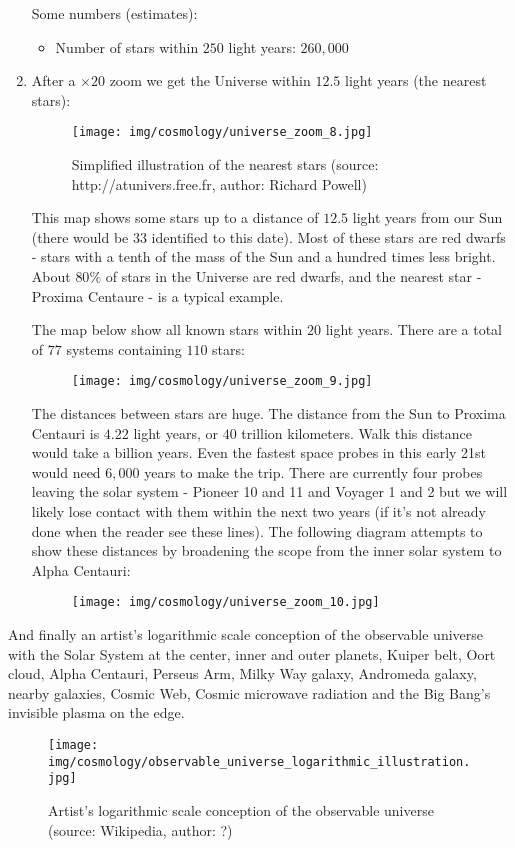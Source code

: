 \begin{enumerate}
		Some numbers (estimates):
		\begin{itemize}
			\item Number of stars within $250$ light years: $260,000$
		\end{itemize}
		
		\item After a $\times 20$ zoom we get the Universe within $12.5$ light years (the nearest stars):
		\begin{figure}[H]
			\centering
			\texttt{[image: img/cosmology/universe\_zoom\_8.jpg]}
			\caption{Simplified illustration of the nearest stars (source: http://atunivers.free.fr, author: Richard Powell)}
		\end{figure}
		This map shows some stars up to a distance of $12.5$ light years from our Sun (there would be $33$ identified to this date). Most of these stars are red dwarfs - stars with a tenth of the mass of the Sun and a hundred times less bright. About $80\%$ of stars in the Universe are red dwarfs, and the nearest star - Proxima Centaure - is a typical example.
		
		The map below show all known stars within $20$ light years. There are a total of $77$ systems containing $110$ stars:
		\begin{figure}[H]
			\centering
			\texttt{[image: img/cosmology/universe\_zoom\_9.jpg]}
		\end{figure}
		The distances between stars are huge. The distance from the Sun to Proxima Centauri is $4.22$ light years, or $40$ trillion kilometers. Walk this distance would take a billion years. Even the fastest space probes in this early 21st would need $6,000$ years to make the trip. There are currently four probes leaving the solar system - Pioneer 10 and 11 and Voyager 1 and 2 but we will likely lose contact with them within the next two years (if it's not already done when the reader see these lines). The following diagram attempts to show these distances by broadening the scope from the inner solar system to Alpha Centauri:
	\begin{figure}[H]
		\centering
		\texttt{[image: img/cosmology/universe\_zoom\_10.jpg]}
		\end{figure}
	\end{enumerate}
	And finally an artist's logarithmic scale conception of the observable universe with the Solar System at the center, inner and outer planets, Kuiper belt, Oort cloud, Alpha Centauri, Perseus Arm, Milky Way galaxy, Andromeda galaxy, nearby galaxies, Cosmic Web, Cosmic microwave radiation and the Big Bang's invisible plasma on the edge.
	\begin{figure}[H]
		\centering
		\texttt{[image: img/cosmology/observable\_universe\_logarithmic\_illustration.jpg]}
		\caption{Artist's logarithmic scale conception of the observable universe (source: Wikipedia, author: ?)}
	\end{figure}
	
